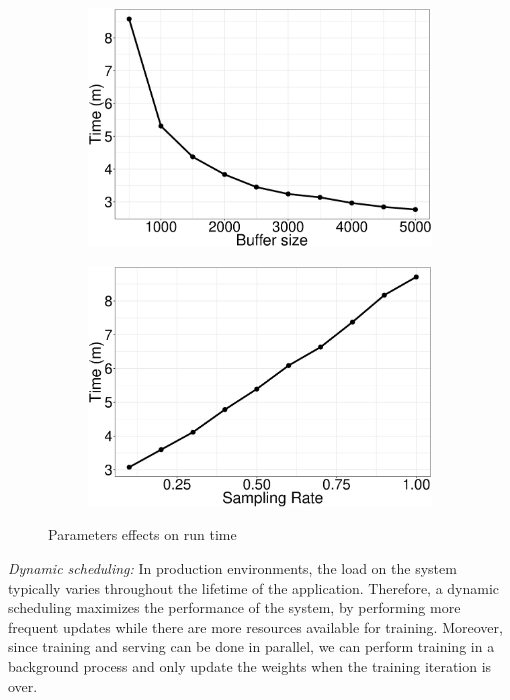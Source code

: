 \documentclass{vldb}
\begin{document}
\begin{figure}[H]
\begin{subfigure}{0.5\columnwidth}
\includegraphics[width=\columnwidth]{../images/experiment-results/movie-lens-100k-buffer-time-improved.eps}
\caption{}
\label{fig:movie-lens-100k-buffer-size-time}
\end{subfigure}%
\begin{subfigure}{0.5\columnwidth}
\includegraphics[width=\columnwidth]{../images/experiment-results/movie-lens-100k-sampling-time-improved.eps}
\caption{}
\label{fig:movie-lens-100k-sample-rate-time}
\end{subfigure}
\vspace{2mm}
\caption{Parameters effects on run time}
\end{figure}

\textit{Dynamic scheduling:} In production environments, the load on the system typically varies throughout the lifetime of the application.
Therefore, a dynamic scheduling maximizes the performance of the system, by performing more frequent updates while there are more resources available for training. 
Moreover, since training and serving can be done in parallel, we can perform training in a background process and only update the weights when the training iteration is over. 
\end{document}
